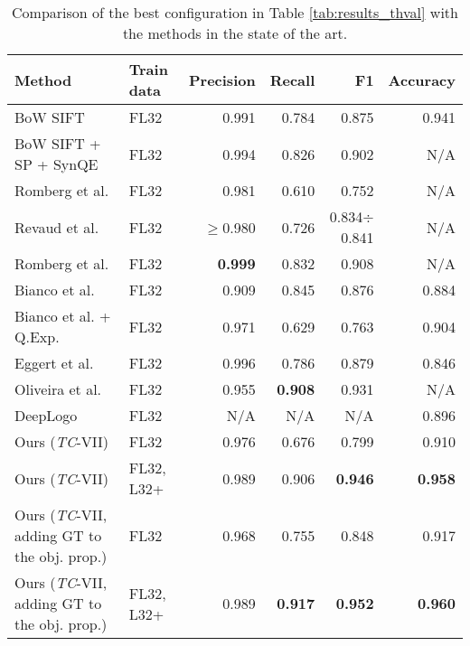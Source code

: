\documentclass[final,5p,twocolumn]{elsarticle}
\begin{document}
\begin{table*}[htbp]
	\caption{Comparison of the best configuration in Table \ref{tab:results_thval} with the methods in the state of the art.}
	\label{tab:comparison}
	\center
\begin{tabularx}{0.97\textwidth}{ll|rrrr}
\toprule
\textbf{Method} & \textbf{Train data} & \textbf{Precision}               & \textbf{Recall}   & \textbf{F1}                 & \textbf{Accuracy} \\ \midrule
BoW SIFT \cite{romberg2013bundle}   & FL32               & 0.991              & 0.784 & 0.875              & 0.941 \\
BoW SIFT + SP + SynQE \cite{romberg2013bundle} & FL32& 0.994              & 0.826 & 0.902              & N/A   \\
Romberg et al. \cite{romberg2011scalable}   & FL32          & 0.981              & 0.610 & 0.752              & N/A   \\
Revaud et al. \cite{revaud2012correlation}  & FL32           & $\geq$0.980 & 0.726 & 0.834$\div$0.841 & N/A   \\
Romberg et al. \cite{romberg2013bundle}   & FL32          & \textbf{0.999}              & 0.832 & 0.908              & N/A   \\
Bianco et al. \cite{bianco2015logo}   & FL32          & 0.909              & 0.845 & 0.876              & 0.884   \\
Bianco et al. + Q.Exp. \cite{bianco2015logo}  & FL32           & 0.971              & 0.629 & 0.763              & 0.904   \\
Eggert et al. \cite{eggert2015benefit}  & FL32         & 0.996              & 0.786 & 0.879              & 0.846   \\
{Oliveira et al. \cite{oliveira2016automatic}}   & {FL32}          & {0.955 }               & {\textbf{0.908}}   & {0.931}                & {N/A}  \\
DeepLogo \cite{iandola2015deeplogo}   & FL32          & N/A                & N/A   & N/A                & 0.896 \\ \midrule
Ours (\emph{TC}-VII) & FL32                 & 0.976              & 0.676           & 0.799              & 0.910 \\
Ours (\emph{TC}-VII) & FL32, L32+            & 0.989              & 0.906  & \textbf{0.946}     & \textbf{0.958} \\ \midrule
Ours (\emph{TC}-VII, adding GT to the obj. prop.) & FL32            & 0.968              & 0.755           & 0.848              & 0.917 \\
Ours (\emph{TC}-VII, adding GT to the obj. prop.) & FL32, L32+        & 0.989              & \textbf{0.917}  & \textbf{0.952}     & \textbf{0.960} \\ \bottomrule
\end{tabularx}
\end{table*}
\end{document}
